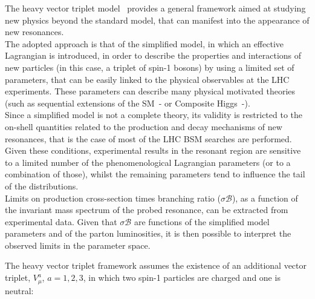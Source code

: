 The heavy vector triplet model~\cite{Pappadopulo2014} provides a general framework aimed at studying new physics beyond the standard model, that can manifest into the appearance of new resonances.\\
The adopted approach is that of the simplified model, in which an effective Lagrangian is introduced, in order to describe the properties and interactions of new particles (in this case, a triplet of spin-1 bosons) by using a limited set of parameters, that can be easily linked to the physical observables at the LHC experiments. These parameters can describe many physical motivated theories (such as sequential extensions of the SM~\cite{Barger:1980ix}-\cite{Grojean:2011vu} or Composite Higgs~\cite{Contino2011}-\cite{Bellazzini:2014yua}). \\
Since a simplified model is not a complete theory, its validity is restricted to the on-shell quantities related to the production and decay mechanisms of new resonances, that is the case of most of the LHC BSM searches are performed. Given these conditions, experimental results in the resonant region are sensitive to a limited number of the phenomenological Lagrangian parameters (or to a combination of those), whilst the remaining parameters tend to influence the tail of the distributions.\\
Limits on production cross-section times branching ratio ($\sigma  \mathcal{B}$), as a function of the invariant mass spectrum of the probed resonance, can be extracted from experimental data. Given that $\sigma  \mathcal{B}$ are functions of the simplified model parameters and of the parton luminosities, it is then possible to interpret the observed limits in the parameter space.


The heavy vector triplet framework assumes the existence of an additional vector triplet, $V_{\mu}^a$, $a=1,2,3$, in which two spin-1 particles are charged and one is neutral:

